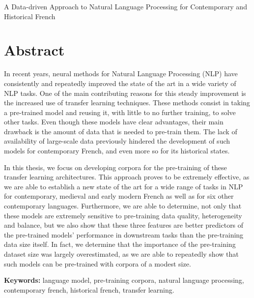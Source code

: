 \pagebreak

\begin{center}
    {\huge A Data-driven Approach to Natural Language Processing for Contemporary and Historical French}
\end{center}

\section*{Abstract}

In recent years, neural methods for Natural Language Processing (NLP) have consistently and repeatedly improved the state of the art in a wide variety of NLP tasks. One of the main contributing reasons for this steady improvement is the increased use of transfer learning techniques. These methods consist in taking a pre-trained model and reusing it, with little to no further training, to solve other tasks. Even though these models have clear advantages, their main drawback is the amount of data that is needed to pre-train them. The lack of availability of large-scale data previously hindered the development of such models for contemporary French, and even more so for its historical states.

In this thesis, we focus on developing corpora for the pre-training of these transfer learning architectures. This approach proves to be extremely effective, as we are able to establish a new state of the art for a wide range of tasks in NLP for contemporary, medieval and early modern French as well as for six other contemporary languages. Furthermore, we are able to determine, not only that these models are extremely sensitive to pre-training data quality, heterogeneity and balance, but we also show that these three features are better predictors of the pre-trained models' performance in downstream tasks than the pre-training data size itself. In fact, we determine that the importance of the pre-training dataset size was largely overestimated, as we are able to repeatedly show that such models can be pre-trained with corpora of a modest size.

\vspace{1cm}
\textbf{Keywords:} language model, pre-training corpora, natural language processing, contemporary french, historical french, transfer learning.

\pagebreak
